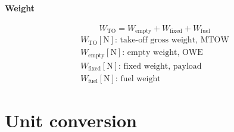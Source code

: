\documentclass[10pt, twocolumn]{article}
\begin{document}
\paragraph{Weight}
\[
  W_\mathrm{TO} = W_\mathrm{empty} + W_\mathrm{fixed} + W_\mathrm{fuel}
\]
\[
  \begin{array}{|l}
    W_\mathrm{TO} [\si{\newton}] \text{: take-off gross weight, MTOW} \\
    W_\mathrm{empty} [\si{\newton}] \text{: empty weight, OWE}        \\
    W_\mathrm{fixed} [\si{\newton}] \text{: fixed weight, payload}    \\
    W_\mathrm{fuel} [\si{\newton}] \text{: fuel weight}
  \end{array}
\]


\section{Unit conversion}
\end{document}
